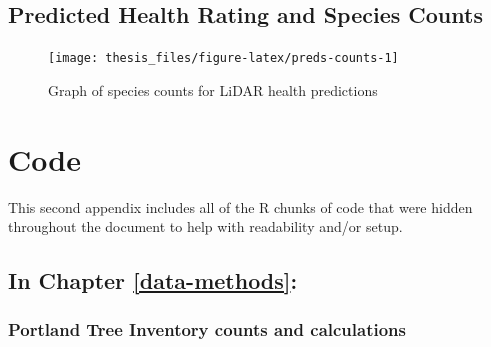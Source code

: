 \documentclass[12pt,twoside]{reedthesis}
\begin{document}
\hypertarget{predicted-health-rating-and-species-counts}{%
\section*{Predicted Health Rating and Species Counts}\label{predicted-health-rating-and-species-counts}}
\begin{figure}

{\centering \texttt{[image: thesis\_files/figure-latex/preds-counts-1]} 

}

\caption{Graph of species counts for LiDAR health predictions}\label{fig:preds-counts}
\end{figure}
\hypertarget{code-chunks}{%
\chapter{Code}\label{code-chunks}}

This second appendix includes all of the R chunks of code that were
hidden throughout the document to help with readability and/or setup.

\hypertarget{in-chapter-refdata-methods}{%
\section*{\texorpdfstring{\textbf{In Chapter} \ref{data-methods}\textbf{:}}{In Chapter \ref{data-methods}:}}\label{in-chapter-refdata-methods}}

\hypertarget{portland-tree-inventory-counts-and-calculations}{%
\subsection*{Portland Tree Inventory counts and calculations}\label{portland-tree-inventory-counts-and-calculations}}
\end{document}
